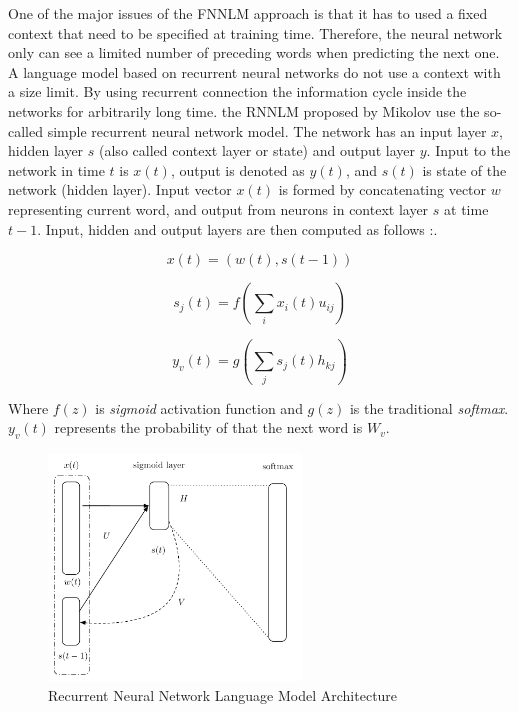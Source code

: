One of the major issues of the \ac{FNNLM} approach is that
it has to used a fixed context that need to be specified at training time.
Therefore, the neural network only can see a limited number of preceding
words when predicting the next one.  A language model based on recurrent neural networks  do not use a context
with a size limit.  By using recurrent connection the information cycle
inside the networks for arbitrarily long time. the \ac{RNNLM} proposed by
Mikolov use the so-called simple
recurrent neural network model. The network has an input layer $x$, hidden
layer $s$ (also called context layer or state) and output layer $y$. Input to
the network in time $t$ is $x(t)$, output is denoted as $y(t)$, and $s(t)$ is
state of the network (hidden layer). Input vector $x(t)$ is formed by
concatenating vector $w$ representing current word, and output from neurons in
context layer $s$ at time $t - 1$. Input, hidden and output layers are then
computed as follows \cite{conf/interspeech/MikolovKBCK10}:.

\begin{equation} x(t) = (w(t), s(t-1))  \end{equation} 

\begin{equation} s_j(t) = f \left( \sum_{i}{x_i(t)u_{ij}}
  \right)   \end{equation}

\begin{equation}  y_v(t) = g \left( \sum_{j}{s_j(t)h_{kj}}
  \right)   \end{equation}


Where   $f(z)$ is \textit{sigmoid} activation function and $g(z)$  is the
traditional   \textit{softmax}.  $y_v(t)$ represents the probability of that
the next word is $W_v$.


\begin{figure}[hptb!]
    \centering
    \includegraphics[width=0.6\textwidth]{images/mikolov-rnnlm.pdf} 
    \caption{Recurrent Neural Network Language Model Architecture}
    \label{fig:RNNLM_architecture}
\end{figure}



